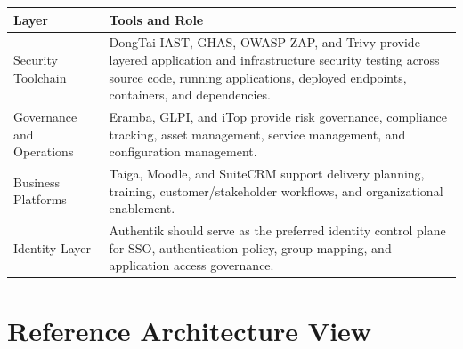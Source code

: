 \documentclass[10pt,letterpaper]{article}
\begin{document}
\begin{tabularx}{\textwidth}{L{1.65in} Y}
\toprule
\textbf{Layer} & \textbf{Tools and Role} \\
\midrule
Security Toolchain & DongTai-IAST, GHAS, OWASP ZAP, and Trivy provide layered application and infrastructure security testing across source code, running applications, deployed endpoints, containers, and dependencies. \\
Governance and Operations & Eramba, GLPI, and iTop provide risk governance, compliance tracking, asset management, service management, and configuration management. \\
Business Platforms & Taiga, Moodle, and SuiteCRM support delivery planning, training, customer/stakeholder workflows, and organizational enablement. \\
Identity Layer & Authentik should serve as the preferred identity control plane for SSO, authentication policy, group mapping, and application access governance. \\
\bottomrule
\end{tabularx}

\section{Reference Architecture View}
\end{document}
